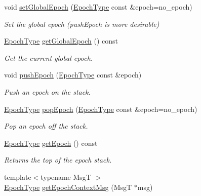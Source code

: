 \begin{DoxyCompactItemize}
void \hyperlink{structvt_1_1messaging_1_1_active_messenger_aa17a3e718783d3aa08cd61d81abeb6a5}{set\+Global\+Epoch} (\hyperlink{namespacevt_a985a5adf291c34a3ca263b3378388236}{Epoch\+Type} const \&epoch=no\+\_\+epoch)
\begin{DoxyCompactList}\small\item\em Set the global epoch ({\ttfamily push\+Epoch} is more desirable) \end{DoxyCompactList}\item 
\hyperlink{namespacevt_a985a5adf291c34a3ca263b3378388236}{Epoch\+Type} \hyperlink{structvt_1_1messaging_1_1_active_messenger_abb892a84a906954d8769794ccfb0c638}{get\+Global\+Epoch} () const
\begin{DoxyCompactList}\small\item\em Get the current global epoch. \end{DoxyCompactList}\item 
void \hyperlink{structvt_1_1messaging_1_1_active_messenger_ac60a61b85392a5c40d2334919981963a}{push\+Epoch} (\hyperlink{namespacevt_a985a5adf291c34a3ca263b3378388236}{Epoch\+Type} const \&epoch)
\begin{DoxyCompactList}\small\item\em Push an epoch on the stack. \end{DoxyCompactList}\item 
\hyperlink{namespacevt_a985a5adf291c34a3ca263b3378388236}{Epoch\+Type} \hyperlink{structvt_1_1messaging_1_1_active_messenger_a0ff3c2d9bf6ccd66002679b93821229c}{pop\+Epoch} (\hyperlink{namespacevt_a985a5adf291c34a3ca263b3378388236}{Epoch\+Type} const \&epoch=no\+\_\+epoch)
\begin{DoxyCompactList}\small\item\em Pop an epoch off the stack. \end{DoxyCompactList}\item 
\hyperlink{namespacevt_a985a5adf291c34a3ca263b3378388236}{Epoch\+Type} \hyperlink{structvt_1_1messaging_1_1_active_messenger_a627a8b2918ad283edf386038cf5693ca}{get\+Epoch} () const
\begin{DoxyCompactList}\small\item\em Returns the top of the epoch stack. \end{DoxyCompactList}\item 
{\footnotesize template$<$typename MsgT $>$ }\\\hyperlink{namespacevt_a985a5adf291c34a3ca263b3378388236}{Epoch\+Type} \hyperlink{structvt_1_1messaging_1_1_active_messenger_aa60710a2d4a1ac7fe60113fd8cbb9809}{get\+Epoch\+Context\+Msg} (MsgT $\ast$msg)

\end{DoxyCompactItemize}

